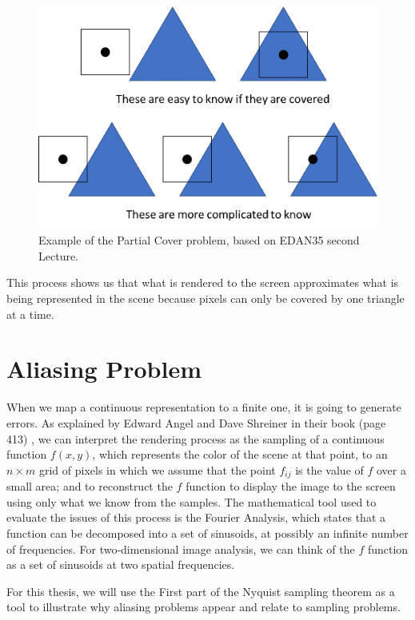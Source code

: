 \documentclass{cslthse-msc}
\begin{document}
\begin{figure}[!hbt]
	\centering
	\includegraphics[scale=0.5]{images/edge_testing.png} 
	\caption{Example of the Partial Cover problem, based on EDAN35 second Lecture. ~\cite{Doggett2017EDAN35}}\label{fig:partialcover}
\end{figure}

This process shows us that what is rendered to the screen approximates what is being represented in the scene because pixels can only be covered by one triangle at a time. \cite{Moller2007, Doggett2017EDAN35}


\section{Aliasing Problem}
When we map a continuous representation to a finite one, it is going to generate errors. As explained by Edward Angel and Dave Shreiner in their book (page 413) \cite{Shreiner2011}, we can interpret the rendering process as the sampling of a continuous function $f(x, y)$, which represents the color of the scene at that point, to an $n\times m$  grid of pixels in which we assume that the point $f_{ij}$  is the value of $f$ over a small area; and to reconstruct the $f$ function to display the image to the screen using only what we know from the samples. The mathematical tool used to evaluate the issues of this process is the Fourier Analysis, which states that a function can be decomposed into a set of sinusoids, at possibly an infinite number of frequencies. For two-dimensional image analysis, we can think of the $f$ function as a set of sinusoids at two spatial frequencies.

For this thesis, we will use the First part of the Nyquist sampling theorem as a tool to illustrate why aliasing problems appear and relate to sampling problems. \\
\end{document}
